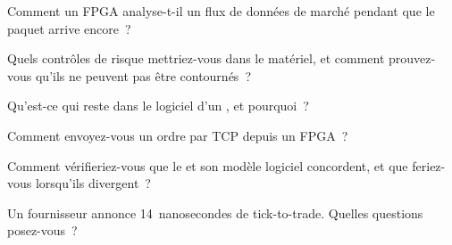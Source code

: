 \begin{interviewq}\label{iq:nw:programmable-hardware-ii-trading-designs:1}
Comment un FPGA analyse-t-il un flux de données de marché pendant que le paquet arrive encore~?
\end{interviewq}

\begin{interviewq}\label{iq:nw:programmable-hardware-ii-trading-designs:2}
Quels contrôles de risque mettriez-vous dans le matériel, et comment prouvez-vous qu'ils ne peuvent pas être contournés~?
\end{interviewq}

\begin{interviewq}\label{iq:nw:programmable-hardware-ii-trading-designs:3}
Qu'est-ce qui reste dans le logiciel d'un , et pourquoi~?
\end{interviewq}

\begin{interviewq}\label{iq:nw:programmable-hardware-ii-trading-designs:4}
Comment envoyez-vous un ordre par TCP depuis un FPGA~?
\end{interviewq}

\begin{interviewq}\label{iq:nw:programmable-hardware-ii-trading-designs:5}
Comment vérifieriez-vous que le  et son modèle logiciel concordent, et que feriez-vous lorsqu'ils divergent~?
\end{interviewq}

\begin{interviewq}\label{iq:nw:programmable-hardware-ii-trading-designs:6}
Un fournisseur annonce 14~nanosecondes de tick-to-trade. Quelles questions posez-vous~?
\end{interviewq}
